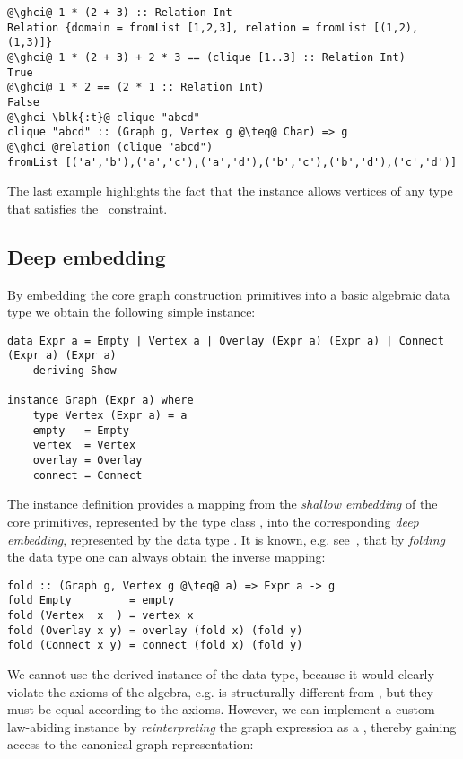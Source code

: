 \begin{verbatim}
@\ghci@ 1 * (2 + 3) :: Relation Int
Relation {domain = fromList [1,2,3], relation = fromList [(1,2),(1,3)]}
@\ghci@ 1 * (2 + 3) + 2 * 3 == (clique [1..3] :: Relation Int)
True
@\ghci@ 1 * 2 == (2 * 1 :: Relation Int)
False
@\ghci \blk{:t}@ clique "abcd"
clique "abcd" :: (Graph g, Vertex g @\teq@ Char) => g
@\ghci @relation (clique "abcd")
fromList [('a','b'),('a','c'),('a','d'),('b','c'),('b','d'),('c','d')]
\end{verbatim}

\noindent
The last example highlights the fact that the  instance allows vertices
of any type  that satisfies the~ constraint.

\subsection{Deep embedding}\label{sub-embedding}

By embedding the core graph construction primitives into a basic algebraic data type
we obtain the following simple  instance:

\begin{verbatim}
data Expr a = Empty | Vertex a | Overlay (Expr a) (Expr a) | Connect (Expr a) (Expr a)
    deriving Show

instance Graph (Expr a) where
    type Vertex (Expr a) = a
    empty   = Empty
    vertex  = Vertex
    overlay = Overlay
    connect = Connect
\end{verbatim}

The instance definition provides a mapping from the \emph{shallow embedding}
of the core primitives, represented by the type class , into the
corresponding \emph{deep embedding}, represented by the data type .
It is known, e.g. see~\citet{2014_gibbons_folding}, that by \emph{folding} the data
type one can always obtain the inverse mapping:

\begin{verbatim}
fold :: (Graph g, Vertex g @\teq@ a) => Expr a -> g
fold Empty         = empty
fold (Vertex  x  ) = vertex x
fold (Overlay x y) = overlay (fold x) (fold y)
fold (Connect x y) = connect (fold x) (fold y)
\end{verbatim}

We cannot use the derived  instance of the  data type, because it
would clearly violate the axioms of the algebra, e.g.  is
structurally different from , but they must be equal according to the axioms.
However, we can implement a custom law-abiding 
instance by \emph{reinterpreting} the graph expression 
as a , thereby gaining access to the canonical graph representation:

